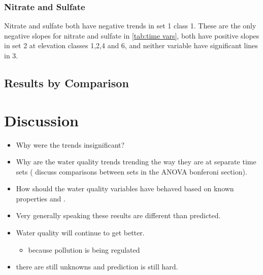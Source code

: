 \subsubsection{Nitrate and Sulfate}

Nitrate and sulfate both have negative trends in set 1 class 1.  These are the only negative slopes for nitrate and sulfate in \autoref{tab:time vars}, both have positive slopes in set 2 at elevation classes 1,2,4 and 6, and neither variable have significant lines in 3.

\subsection{Results by Comparison}

\section{Discussion}

\begin{itemize}
	\item Why were the trends insignificant?
	\item Why are the water quality trends trending the way they are at separate time sets ( discuss comparisons between sets in the ANOVA bonferoni section).
	\item How should the water quality variables have behaved based on known properties and \citep{robinson2008ph}.
	\item Very generally speaking these results are different than \citep{robinson2008ph} predicted.
	\item Water quality will continue to get better.
	\begin{itemize}
		\item because pollution is being regulated
	\end{itemize}
	\item there are still unknowns and prediction is still hard.
\end{itemize}
	
